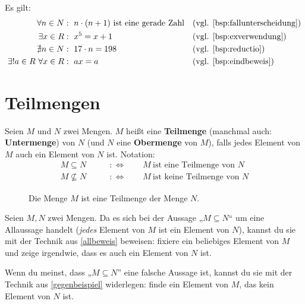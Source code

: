 \begin{bsp}
    Es gilt:
    \begin{align*}
        \forall n\in \N &:\ n\cdot (n+1)\ \text{ist eine gerade Zahl} && (\text{vgl. \cref{bsp:fallunterscheidung}})\\
        \exists x\in \R &:\ x^5 = x+1 && (\text{vgl. \cref{bsp:exverwendung}})\\
        \nexists n\in \N &:\ 17\cdot n = 198 && (\text{vgl. \cref{bsp:reductio}})\\ 
        \exists ! a\in \R \ \forall x\in \R & :\ ax=a &&(\text{vgl. \cref{bsp:eindbeweis}})
    \end{align*}
\end{bsp}





\section{Teilmengen}


\begin{defin}[Teilmenge] \label{def:teilmenge} 
    Seien $M$ und $N$ zwei Mengen. $M$ heißt eine \textbf{Teilmenge} (manchmal auch: \textbf{Untermenge}) von $N$ (und $N$ eine \textbf{Obermenge} von $M$), falls jedes Element von $M$ auch ein Element von $N$ ist. Notation:
    \begin{align*}
        M \subseteq N \qquad &:\Leftrightarrow\qquad M\ \text{ist eine Teilmenge von $N$} \\
        M \nsubseteq N \qquad &:\Leftrightarrow\qquad M\ \text{ist keine Teilmenge von $N$}
    \end{align*}
\end{defin}


\begin{figure}[ht]
    \centering \caption{Die Menge $M$ ist eine Teilmenge der Menge $N$.}
\end{figure}


\begin{bem} \label{teilmengebeweisen}
    Seien $M,N$ zwei Mengen. Da es sich bei der Aussage „$M\subseteq N$“ um eine Allaussage handelt (\emph{jedes} Element von $M$ ist ein Element von $N$), kannst du sie mit der Technik aus \cref{allbeweis} beweisen: fixiere ein beliebiges Element von $M$ und zeige irgendwie, dass es auch ein Element von $N$ ist.

    Wenn du meinst, dass „$M\subseteq N$” eine falsche Aussage ist, kannst du sie mit der Technik aus \cref{gegenbeispiel} widerlegen: finde ein Element von $M$, das kein Element von $N$ ist.
\end{bem}


